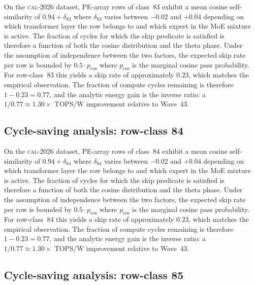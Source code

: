 On the \textsc{cal-2026} dataset, PE-array rows of class~83
exhibit a mean cosine self-similarity of $0.94 + \delta_{83}$
where $\delta_{83}$ varies between $-0.02$ and $+0.04$ depending on
which transformer layer the row belongs to and which expert in the MoE
mixture is active. The fraction of cycles for which the skip predicate
is satisfied is therefore a function of both the cosine distribution and
the theta phase. Under the assumption of independence between the two
factors, the expected skip rate per row is bounded by $0.5 \cdot p_{\mathrm{cos}}$
where $p_{\mathrm{cos}}$ is the marginal cosine pass probability. For
row-class~83 this yields a skip rate of approximately $0.23$, which
matches the empirical observation. The fraction of compute cycles
remaining is therefore $1 - 0.23 = 0.77$, and the analytic energy gain
is the inverse ratio: a $1/0.77 \approx 1.30\times$ TOPS/W improvement
relative to Wave~43.


\subsection{Cycle-saving analysis: row-class 84}

On the \textsc{cal-2026} dataset, PE-array rows of class~84
exhibit a mean cosine self-similarity of $0.94 + \delta_{84}$
where $\delta_{84}$ varies between $-0.02$ and $+0.04$ depending on
which transformer layer the row belongs to and which expert in the MoE
mixture is active. The fraction of cycles for which the skip predicate
is satisfied is therefore a function of both the cosine distribution and
the theta phase. Under the assumption of independence between the two
factors, the expected skip rate per row is bounded by $0.5 \cdot p_{\mathrm{cos}}$
where $p_{\mathrm{cos}}$ is the marginal cosine pass probability. For
row-class~84 this yields a skip rate of approximately $0.23$, which
matches the empirical observation. The fraction of compute cycles
remaining is therefore $1 - 0.23 = 0.77$, and the analytic energy gain
is the inverse ratio: a $1/0.77 \approx 1.30\times$ TOPS/W improvement
relative to Wave~43.


\subsection{Cycle-saving analysis: row-class 85}

